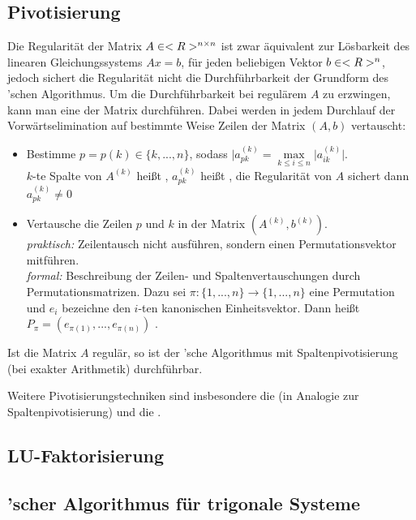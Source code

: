 \subsection{Pivotisierung}

Die Regularität der Matrix $A\in<R>^{n\times n}$ ist zwar äquivalent zur Lösbarkeit des linearen Gleichungssystems $Ax=b$, für jeden beliebigen Vektor $b\in<R>^n$, jedoch sichert die Regularität nicht die Durchführbarkeit der Grundform des 'schen Algorithmus. Um die Durchführbarkeit bei regulärem $A$ zu erzwingen, kann man eine  der Matrix durchführen. Dabei werden in jedem Durchlauf der Vorwärtselimination auf bestimmte Weise Zeilen der Matrix $(A,b)$ vertauscht:
\begin{itemize}
	\item Bestimme $p=p(k)\in\{k,...,n\}$, sodass $\vert a_{pk}^{(k)}=\max\limits_{k\le i\le n}\vert a_{ik}^{(k)}\vert$. \\
	$k$-te Spalte von $A^{(k)}$ heißt , $a_{pk}^{(k)}$ heißt , die Regularität von $A$ sichert dann $a_{pk}^{(k)}\neq 0$
	\item Vertausche die Zeilen $p$ und $k$ in der Matrix $(A^{(k)},b^{(k)})$. \\
	\emph{praktisch:} Zeilentausch nicht ausführen, sondern einen Permutationsvektor mitführen. \\
	\emph{formal:} Beschreibung der Zeilen- und Spaltenvertauschungen durch Permutationsmatrizen. Dazu sei $\pi:\{1,...,n\}\to\{1,...,n\}$ eine Permutation und $e_i$ bezeichne den $i$-ten kanonischen Einheitsvektor. Dann heißt $P_\pi=(e_{\pi(1)},...,e_{\pi(n)})$ .
\end{itemize}

\begin{proposition}
	Ist die Matrix $A$ regulär, so ist der 'sche Algorithmus mit Spaltenpivotisierung (bei exakter Arithmetik) durchführbar.
\end{proposition}

Weitere Pivotisierungstechniken sind insbesondere die  (in Analogie zur Spaltenpivotisierung) und die .

\subsection{LU-Faktorisierung}

\subsection{'scher Algorithmus für trigonale Systeme}